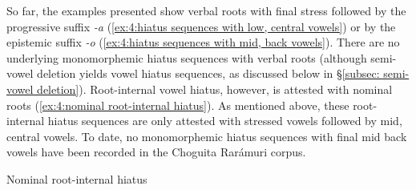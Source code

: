     \z
\z

So far, the examples presented show verbal roots with final stress followed by the progressive suffix \textit{-a} (\ref{ex:4:hiatus sequences with low, central vowels}) or by the epistemic suffix \textit{-o} (\ref{ex:4:hiatus sequences with mid, back vowels}). There are no underlying monomorphemic hiatus sequences with verbal roots (although semi-vowel deletion yields vowel hiatus sequences, as discussed below in §\ref{subsec: semi-vowel deletion}). Root-internal vowel hiatus, however, is attested with nominal roots (\ref{ex:4:nominal root-internal hiatus}). As mentioned above, these root-internal hiatus sequences are only attested with stressed vowels followed by mid, central vowels. To date, no monomorphemic hiatus sequences with final mid back vowels have been recorded in the Choguita Rarámuri corpus.

\ea\label{ex:4:nominal root-internal hiatus}
{Nominal root-internal hiatus}


